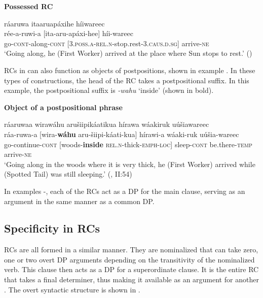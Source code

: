 \documentclass[output=paper]{LSP/langsci}
\begin{document}
\ea \textbf{Possessed RC} \label{boyle4}

\glll r\'aaruwa  {\ob}itaaruap\'axihe{\cb}   h\'iiwareec\\
r\'ee-a-ruwi-a  [ita-aru-ap\'axi-hee] h\'ii-wareec\\
go-\textsc{cont}-along-\textsc{cont} [\textsc{3.poss.a-rel.n}-stop.rest-\textsc{3.caus.d.sg}] arrive-\textsc{ne}\\
\trans `Going along, he (First Worker) arrived at the place where Sun stops to rest.' (\citealt[I: 21]{Lowie1939})
\z

RCs in  can also function as objects of postpositions, shown in example . In these types of constructions, the head of the RC takes a postpositional suffix. In this example, the postpositional suffix is \textit{-wahu} `inside' (shown in bold). 

\ea \textbf{Object of a postpositional phrase} \label{boyle5}

\glll r\'aaruwaa   {\ob}wiraw\'ahu  aru\v{s}iipik\'aatikua{\cb}   h\'irawa w\'aakiruk u\'u\v{s}iawareec\\
r\'aa-ruwa-a [wira-\textbf{w\'ahu} aru-\v{s}iipi-k\'aati-kua] h\'irawi-a w\'aaki-ruk u\'u\v{s}ia-wareec\\     
go-continue-\textsc{cont} [woods-\textbf{inside}  \textsc{rel.n}-thick-\textsc{emph-loc}] sleep-\textsc{cont} be.there-\textsc{temp} arrive-\textsc{ne}\\
\trans `Going along in the woods where it is very thick, he (First Worker) arrived while (Spotted Tail) was still sleeping.' (\citealt{Lowie1939}, II:54)
\z

In examples -, each of the RCs act as a DP for the main clause, serving as an argument in the same manner as a common DP.

\subsection{Specificity in  RCs}\label{sec:boyle:2.2}

 RCs are all formed in a similar manner. They are nominalized  that can take zero, one or two overt DP arguments depending on the transitivity of the nominalized verb. This clause then acts as a DP for a superordinate clause. It is the entire RC that takes a final determiner, thus making it available as an argument for another . The overt syntactic structure is shown in .
\end{document}

